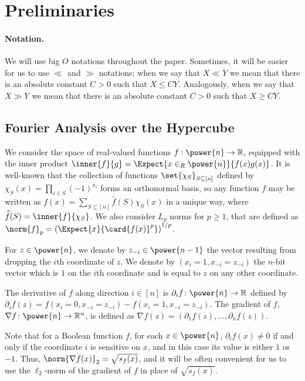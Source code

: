 \section{Preliminaries}
\paragraph{Notation.} We will use big $O$ notations throughout the paper. Sometimes, it will be easier for us to use
$\ll$ and $\gg$ notations; when we say that $X\ll Y$ we mean that there is an absolute constant $C>0$ such that $X\leq C Y$.
Analogously, when we say that $X\gg Y$ we mean that there is an absolute constant $C>0$ such that $X\geq C Y$.

\subsection{Fourier Analysis over the Hypercube}
We consider the space of real-valued functions $f:\power{n} \to {\mathbb R}$,
equipped with the inner product $\inner{f}{g} = \Expect{x\in_R\power{n}}{f(x)g(x)}$.
It is well-known that the collection of functions $\set{\chi_S}_{S\subseteq[n]}$ defined by
$\chi_S(x) = \prod\limits_{i\in S}{(-1)^{x_i}}$ forms an orthonormal basis, so any function $f$
may be written as $f(x) = \sum\limits_{S\subseteq[n]}{\widehat{f}(S)\chi_S(x)}$ in a unique way,
where
$\widehat{f}(S) = \inner{f}{\chi_S}$.
We also consider $L_p$ norms for $p \geq 1$,
that are defined as $\norm{f}_p= \left(\Expect{x}{\card{f(x)}^p}\right)^{1/p}$.

For $z\in\power{n}$, we denote by $z_{-i}\in\power{n-1}$ the vector resulting from dropping
the $i$th coordinate of $z$. We denote by $(x_i = 1, x_{-i} = z_{-i})$ the $n$-bit vector
which is $1$ on the $i$th coordinate and is equal to $z$ on any other coordinate.
\begin{definition}
  The derivative of $f$ along direction $i\in[n]$
  is $\partial_i f\colon\power{n}\to\mathbb{R}$ defined by
  $\partial_i f(z) = f(x_i = 0, x_{-i} = z_{-i}) - f(x_i = 1, x_{-i} = z_{-i})$.
  The gradient of $f$, $\nabla f\colon\power{n}\to\mathbb{R}^n$, is defined
  as $\nabla f(z) = (\partial_1 f(z),\ldots,\partial_n f(z))$.
\end{definition}
Note that for a Boolean function $f$, for each $x\in\power{n}$, $\partial_i f(x) \neq 0$ if and only if the coordinate $i$
is sensitive on $x$, and in this case its value is either $1$ or $-1$. Thus, $\norm{\nabla f(x)}_2 = \sqrt{s_f(x)}$,
and it will be often convenient for us to use the $\ell_2$-norm of the gradient of $f$ in place of $\sqrt{s_f(x)}$.

